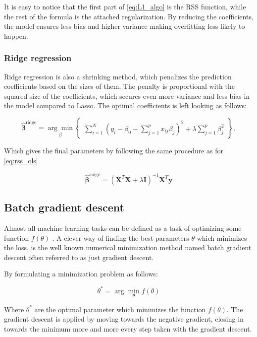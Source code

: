 \documentclass[../main.tex]{subfiles}
\begin{document}
It is easy to notice that the first part of \autoref{eq:L1_algo} is the RSS function, while the rest of the formula is the attached regularization. By reducing the coefficients, the model ensures less bias and higher variance making overfitting less likely to happen.

\subsubsection{Ridge regression}\label{rid}
Ridge regression is also a shrinking method, which penalizes the prediction coefficients based on the sizes of them. The penalty is proportional with the squared size of the coefficients, which secures even more variance and less bias in the model compared to Lasso. The optimal coefficients is left looking as follows: 

\begin{equation*}
  \hat{\boldsymbol{\beta}}^{\text{ridge}} = \underset{\beta}{\arg \min} \begin{Bmatrix}\sum_{i=1}^N\left(y_i - \beta_0 - \sum_{j=1}^p x_{ij}\beta_j\right)^2 + \lambda \sum_{j=1}^p \beta_j^2 \end{Bmatrix},
\end{equation*}

Which gives the final parameters by following the same procedure as for \autoref{eq:rss_ols}

\begin{equation*}
  \hat{\boldsymbol{\beta}}^{\text{ridge}} = (\mathbf X^T\mathbf X + \lambda \mathbf I)^{-1}\mathbf X^T\mathbf y
\end{equation*}

\subsection{Batch gradient descent}
Almost all machine learning tasks can be defined as a task of optimizing some function $f(\theta)$ \cite{andrychowicz2016learning}. A clever way of finding the best parameters \ensuremath{\theta} which minimizes the loss, is the well known numerical minimization method named batch gradient descent often referred to as just gradient descent.

By formulating a minimization problem as follows:

\begin{equation*}
    \theta^{*}=\arg \min _{\theta} f(\theta)
\end{equation*}

Where $\theta^{*}$ are the optimal parameter which minimizes the function $f(\theta)$. The gradient descent is applied by moving towards the negative gradient, closing in towards the minimum more and more every step taken with the gradient descent.
\end{document}
